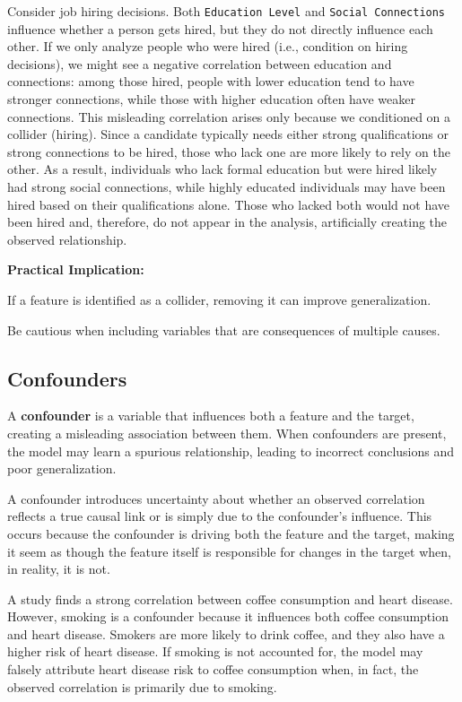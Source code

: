 \documentclass[12pt,openany]{book}
\begin{document}
\begin{examplebox}
Consider job hiring decisions. Both \texttt{Education Level} and \texttt{Social Connections} influence whether a person gets hired, but they do not directly influence each other. If we only analyze people who were hired (i.e., condition on hiring decisions), we might see a negative correlation between education and connections: among those hired, people with lower education tend to have stronger connections, while those with higher education often have weaker connections. This misleading correlation arises only because we conditioned on a collider (hiring). Since a candidate typically needs either strong qualifications or strong connections to be hired, those who lack one are more likely to rely on the other. As a result, individuals who lack formal education but were hired likely had strong social connections, while highly educated individuals may have been hired based on their qualifications alone. Those who lacked both would not have been hired and, therefore, do not appear in the analysis, artificially creating the observed relationship.
\end{examplebox}

\textbf{Practical Implication:}

If a feature is identified as a collider, removing it can improve generalization.

Be cautious when including variables that are consequences of multiple causes.

\subsection{Confounders}

A \textbf{confounder} is a variable that influences both a feature and the target, creating a misleading association between them. When confounders are present, the model may learn a spurious relationship, leading to incorrect conclusions and poor generalization.
\newline

A confounder introduces uncertainty about whether an observed correlation reflects a true causal link or is simply due to the confounder’s influence. This occurs because the confounder is driving both the feature and the target, making it seem as though the feature itself is responsible for changes in the target when, in reality, it is not.

\begin{examplebox}
A study finds a strong correlation between coffee consumption and heart disease. However, smoking is a confounder because it influences both coffee consumption and heart disease. Smokers are more likely to drink coffee, and they also have a higher risk of heart disease. If smoking is not accounted for, the model may falsely attribute heart disease risk to coffee consumption when, in fact, the observed correlation is primarily due to smoking.
\end{examplebox}
\end{document}

